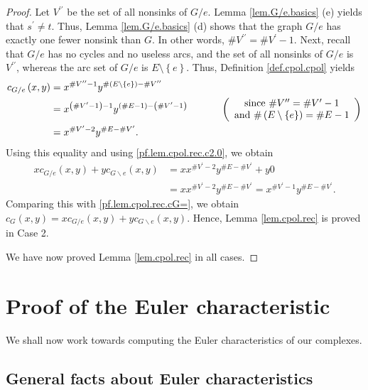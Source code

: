 \documentclass[12pt]{amsart}
\theoremstyle{definition}
\newcommand{\NS}{V^{\prime}}
\begin{document}
\begin{proof}
Let $V^{\prime\prime}$ be the set of all nonsinks of $G/e$. Lemma
\ref{lem.G/e.basics} (e) yields that $s^{\prime}\neq t$. Thus, Lemma
\ref{lem.G/e.basics} (d) shows that the graph $G/e$ has exactly one fewer
nonsink than $G$. In other words, $\#V^{\prime\prime}=\#\NS -1$.
Next, recall that $G/e$ has no cycles
and no useless arcs, and the set of all nonsinks of $G/e$ is $V^{\prime
\prime}$, whereas the arc set of $G/e$ is $E\setminus\left\{  e\right\}  $.
Thus, Definition \ref{def.cpol.cpol} yields%
\begin{align*}
c_{G/e}\left(  x,y\right)   &  =x^{\#V^{\prime\prime}-1}y^{\#\left(
E\setminus\left\{  e\right\}  \right)  -\#V^{\prime\prime}}\\
&  =x^{\left(  \#\NS -1\right)  -1}y^{\left(  \#E-1\right)  -\left(
\#\NS -1\right)  }\ \ \ \ \ \ \ \ \ \ \left(
\begin{array}
[c]{c}%
\text{since }\#V^{\prime\prime}=\#\NS -1\\
\text{and }\#\left(  E\setminus\left\{  e\right\}  \right)  =\#E-1
\end{array}
\right) \\
&  =x^{\#\NS -2}y^{\#E-\#\NS}.
\end{align*}
Using this equality and using \eqref{pf.lem.cpol.rec.c2.0}, we obtain
\begin{align*}
x c_{G/e}\left(  x,y\right)
+ y c_{G\backslash e}\left(  x,y\right)
&  =xx^{\#\NS -2}y^{\#E-\#\NS}+y0 \\
&= xx^{\#\NS -2} y^{\#E-\#\NS}
=x^{\#\NS -1}y^{\#E-\#\NS}.
\end{align*}
Comparing this with \eqref{pf.lem.cpol.rec.cG=}, we obtain $c_{G}\left(
x,y\right)  =xc_{G/e}\left(  x,y\right)  +yc_{G\backslash e}\left(
x,y\right)  $. Hence, Lemma \ref{lem.cpol.rec} is proved in Case 2.

We have now proved Lemma \ref{lem.cpol.rec} in all cases.
\end{proof}

\section{\label{sect.euler-proof}Proof of the Euler characteristic}

We shall now work towards computing the Euler characteristics of our complexes.

\subsection{General facts about Euler characteristics}
\end{document}
